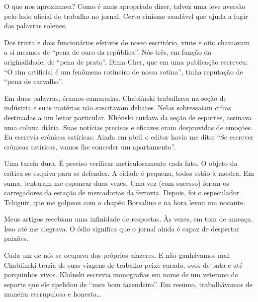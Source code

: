 O que nos aproximava? Como é mais apropriado dizer, talvez uma leve
aversão pelo lado oficial do trabalho no jornal. Certo cinismo saudável
que ajuda a fugir das palavras solenes.

Dos trinta e dois funcionários efetivos de nosso escritório, vinte e
oito chamavam a si mesmos de ``pena de ouro da república''. Nós três, em
função da originalidade, de ``pena de prata''. Dima Cher, que em uma
publicação escreveu: ``O rim artificial é um fenômeno rotineiro de
nossa rotina'', tinha reputação de ``pena de carvalho''.

Em duas palavras, éramos camaradas. Chablínski trabalhava na seção de
indústria e suas matérias não suscitavam debates. Nelas sobressaíam
cifras destinadas a um leitor particular. Kliónski cuidava da seção de
esportes, assinava uma coluna diária. Suas notícias precisas e eficazes
eram desprovidas de emoções. Eu escrevia crônicas satíricas. Ainda em abril o editor havia me dito: ``Se escrever
crônicas satíricas, vamos lhe conceder um apartamento''.

Uma tarefa dura. É preciso verificar meticulosamente cada fato. O objeto
da crítica se esquiva para se defender. A cidade é pequena, todos estão
à mostra. Em suma, tentaram me espancar duas vezes. Uma vez (com
sucesso) foram os carregadores da estação de mercadorias da ferrovia. Depois, foi o
especulador Tchiguir, que me golpeou com o chapéu Borsalino e na hora
levou um nocaute.

Meus artigos recebiam uma infinidade de respostas. Às vezes, em tom de
ameaça. Isso até me alegrava. O ódio significa que o jornal ainda é
capaz de despertar paixões.

Cada um de nós se ocupava dos próprios afazeres. E não ganhávamos mal.
Chablínski trazia de suas viagens de trabalho peixe curado, ovos de pata
e até porquinhos vivos. Kliónski escrevia monografias em nome de um
veterano do esporte que ele apelidou de ``meu bom fazendeiro''. Em
resumo, trabalhávamos de maneira escrupulosa e honesta\ldots{}

